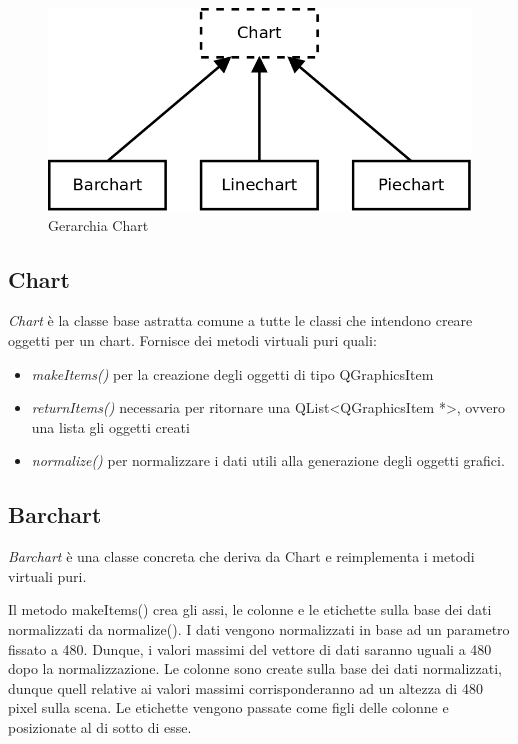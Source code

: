\documentclass[a4paper,10pt]{article}
\begin{document}
\begin{figure}[h]
    \centering
    \includegraphics[scale=0.3]{chart.png}
    \caption{Gerarchia Chart}
\end{figure}

\subsection{Chart}
\emph{Chart} è la classe base astratta comune a tutte le classi che intendono creare oggetti per un chart. Fornisce dei metodi virtuali puri quali:
\begin{itemize}
	\item \emph{makeItems()} per la creazione degli oggetti di tipo QGraphicsItem
	\item \emph{returnItems()} necessaria per ritornare una QList<QGraphicsItem *>, ovvero una lista gli oggetti creati 
	\item \emph{normalize()} per normalizzare i dati utili alla generazione degli oggetti grafici.
\end{itemize}

\subsection{Barchart}
\emph{Barchart} è una classe concreta che deriva da Chart e reimplementa i metodi virtuali puri.

Il metodo makeItems() crea gli assi, le colonne e le etichette sulla base dei dati normalizzati da normalize(). I dati vengono normalizzati in base ad un parametro fissato a 480. Dunque, i valori massimi del vettore di dati saranno uguali a 480 dopo la normalizzazione. Le colonne sono create sulla base dei dati normalizzati, dunque quell relative ai valori massimi corrisponderanno ad un altezza di 480 pixel sulla scena. Le etichette vengono passate come figli delle colonne e posizionate al di sotto di esse.
\end{document}
